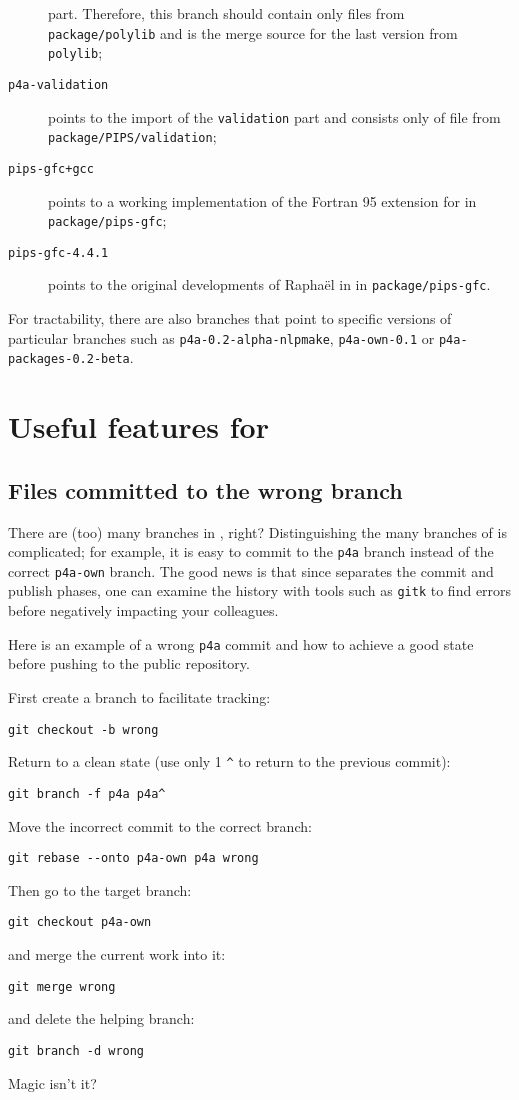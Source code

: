 \documentclass[a4paper]{article}
\begin{document}
\begin{description}
  part. Therefore, this branch should contain only files from
  \texttt{package/polylib} and is the merge source for
  the last version from \texttt{polylib};
\item[\texttt{p4a-validation}] points to the import of the \Apips
  \texttt{validation} part and consists only of file from
  \texttt{package/PIPS/validation};
\item[\texttt{pips-gfc+gcc}] points to a working \Apipsgfc implementation
  of the Fortran 95 extension for \Apips in \texttt{package/pips-gfc};
\item[\texttt{pips-gfc-4.4.1}] points to the original developments of
  Raphaël in \Agcc in \texttt{package/pips-gfc}.
\end{description}

For tractability, there are also branches that point
to specific versions of particular branches such as
\texttt{p4a-0.2-alpha-nlpmake}, \texttt{p4a-own-0.1} or
\texttt{p4a-packages-0.2-beta}.


\section{Useful \protect\Agit features for \protect\Apfa}
\label{sec:some-agit-tricks}

\subsection{Files committed to the wrong branch}
\label{sec:you-have-comited}

There are (too) many branches in \Apfa, right? Distinguishing the many
branches of \Apfa is complicated; for example, it is easy
to commit to the \texttt{p4a} branch instead of the correct
\texttt{p4a-own} branch. The good news is that since \Agit separates
the commit and publish phases, one can examine the history
with tools such as \texttt{gitk} to find errors before negatively
impacting your colleagues.

Here is an example of a wrong \texttt{p4a} commit and how to achieve a
good state before pushing to the public repository.

First create a branch to facilitate tracking:
\begin{verbatim}
git checkout -b wrong
\end{verbatim}
Return to a clean state (use only 1 \verb|^| to return to the previous
commit):
\begin{verbatim}
git branch -f p4a p4a^
\end{verbatim}
Move the incorrect commit to the correct branch:
\begin{verbatim}
git rebase --onto p4a-own p4a wrong
\end{verbatim}
Then go to the target branch:
\begin{verbatim}
git checkout p4a-own
\end{verbatim}
and merge the current work into it:
\begin{verbatim}
git merge wrong
\end{verbatim}
and delete the helping branch:
\begin{verbatim}
git branch -d wrong
\end{verbatim}
Magic isn't it? \smiley
\end{document}

